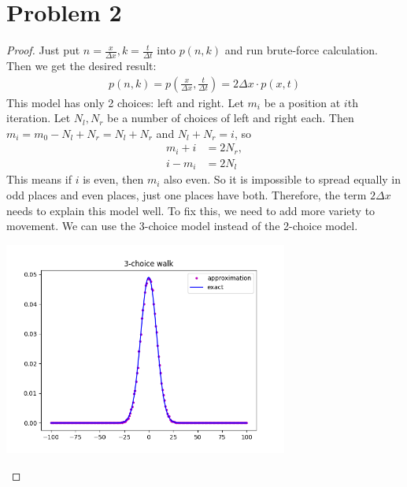 \section*{Problem 2}
	\begin{proof}
		Just put $n = \frac{x}{\Delta x}, k = \frac{t}{\Delta t}$ into $p(n, k)$ and run brute-force calculation. Then we get the desired result:
		\begin{align*}
			p(n, k) = p(\frac{x}{\Delta x}, \frac{t}{\Delta t}) = 2\Delta x \cdot p(x, t)
		\end{align*}
		This model has only 2 choices: left and right. Let $m_i$ be a position at $i$th iteration. Let $N_l, N_r$ be a number of choices of left and right each. Then $m_i = m_0 - N_l + N_r = N_l + N_r$ and $N_l + N_r = i$, so
		\begin{align*}
			m_i + i &= 2N_r,\\
			i - m_i &= 2N_l
		\end{align*}
		This means if $i$ is even, then $m_i$ also even. So it is impossible to spread equally in odd places and even places, just one places have both. Therefore, the term $2\Delta x$ needs to explain this model well. To fix this, we need to add more variety to movement. We can use the 3-choice model instead of the 2-choice model.
		\begin{center}
			\includegraphics[width=0.7\textwidth]{3_and_var.png}
		\end{center}
	\end{proof}